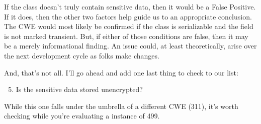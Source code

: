If the class doesn't truly contain sensitive data, then it would be a False Positive. If it does, then the other two factors help guide us to an appropriate conclusion. The CWE would most likely be confirmed if the class is serializable and the field is not marked transient. But, if either of those conditions are false, then it may be a merely informational finding. An issue could, at least theoretically, arise over the next development cycle as folks make changes.

And, that's not all. I'll go ahead and add one last thing to check to our list:
\begin{enumerate}
	\setcounter{enumi}{4}
	\item Is the sensitive data stored unencrypted?
\end{enumerate}

While this one falls under the umbrella of a different CWE (311), it's worth checking while you're evaluating a instance of 499.
